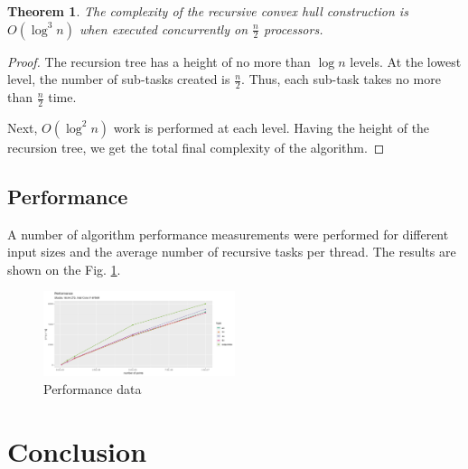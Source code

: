 \documentclass[conference]{IEEEtran}
\theoremstyle{plane}
\newtheorem{theorem}{Theorem}[section]
\begin{document}
		\begin{theorem}
			The complexity of the recursive convex hull construction is $O(\log^3n)$ when executed concurrently on $\frac{n}{2}$ processors.
		\end{theorem}
		
		\begin{proof}
			The recursion tree has a height of no more than $\log n$ levels. At the lowest level, the number of sub-tasks created is $\frac{n}{2}$. Thus, each sub-task takes no more than $\frac{n}{2}$ time.
			
			Next, $O(\log^2 n)$ work is performed at each level. Having the height of the recursion tree, we get the total final complexity of the algorithm.
		\end{proof}
	
	

\subsection{Performance}
		A number of algorithm performance measurements were performed for different input sizes and the average number of recursive tasks per thread. The results are shown on the Fig. \ref{fig:performance}.
		
		\begin{figure}[htbp]
			\centerline{\includegraphics[width=0.5\textwidth, height=0.3\textheight]{performance}}
			\caption{Performance data}
			\label{fig:performance}
		\end{figure}
\section{Conclusion}
\end{document}
